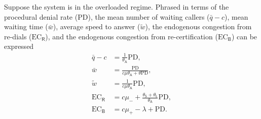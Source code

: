 \documentclass[manuscript,screen,authorversion]{acmart}
\begin{document}
\begin{lemma}\label{rateLemma}
Suppose the system is in the overloaded regime. 
Phrased in terms of the procedural denial rate ($\mathrm{PD}$), the mean number of waiting callers ($\bar{q} - c$), mean waiting time ($\bar w$), average speed to answer ($\tilde w$), the endogenous congestion from re-dials ($\mathrm{EC}_\mathsf{R}$), and the endogenous congestion from re-certification ($\mathrm{EC}_\mathsf{B}$) can be expressed
\begin{align}
\bar q - c 
&= 
\frac{1}{\theta_\mathsf{A}}\mathrm{PD}
,
\\
\bar w
&=
\frac{\mathrm{PD}}{c\mu\theta_\mathsf{A} + \theta \mathrm{PD}}
,
\\
\tilde w
&=
\frac{1}{c\mu \theta_\mathsf{A} } \mathrm{PD}
,
\\
\mathrm{EC}_\mathsf{R}
&=
c \mu_-
+
\frac{\theta_\mathsf{S} + \theta_\mathsf{L}}{\theta_\mathsf{A}}
\mathrm{PD}
,
\\
\mathrm{EC}_\mathsf{B}
&=
c\mu_+ - \lambda + \mathrm{PD}
.
\end{align}
\end{lemma}
\end{document}

